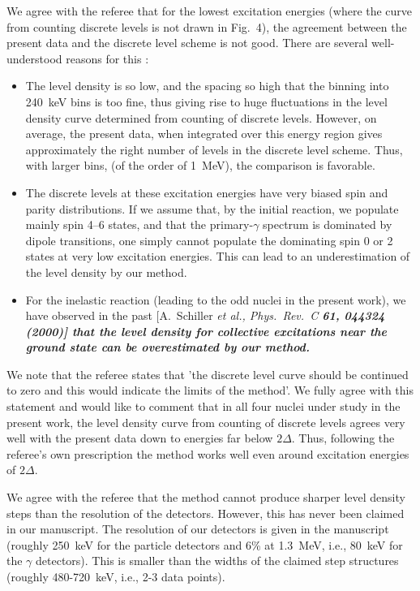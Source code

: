 \documentclass{article}
\begin{document}
We agree with the referee that for the lowest excitation energies (where the 
curve from counting discrete levels is not drawn in Fig.\ 4), the agreement 
between the present data and the discrete level scheme is not good. There are
several well-understood reasons for this :
\begin{itemize}
\item The level density is so low, and the spacing so high that the binning 
into 240~keV bins is too fine, thus giving rise to huge fluctuations in the 
level density curve determined from counting of discrete levels. However, on 
average, the present data, when integrated over this energy region gives 
approximately the right number of levels in the discrete level scheme. Thus, 
with larger bins, (of the order of 1~MeV), the comparison is favorable.
\item The discrete levels at these excitation energies have very biased spin 
and parity distributions. If we assume that, by the initial reaction, we 
populate mainly spin 4--6 states, and that the primary-$\gamma$ spectrum is 
dominated by dipole transitions, one simply cannot populate the dominating spin
0 or 2 states at very low excitation energies. This can lead to an 
underestimation of the level density by our method.
\item For the inelastic reaction (leading to the odd nuclei in the present 
work), we have observed in the past [A.~Schiller \sl et al.\rm, Phys.\ Rev.\ C
\bf 61\rm, 044324 (2000)] that the level density for collective excitations 
near the ground state can be overestimated by our method.
\end{itemize}
We note that the referee states that 'the discrete level curve should be 
continued to zero and this would indicate the limits of the method'. We fully 
agree with this statement and would like to comment that in all four nuclei 
under study in the present work, the level density curve from counting of 
discrete levels agrees very well with the present data down to energies far 
below $2\Delta$. Thus, following the referee's own prescription the method 
works well even around excitation energies of $2\Delta$.

We agree with the referee that the method cannot produce sharper level density
steps than the resolution of the detectors. However, this has never been 
claimed in our manuscript. The resolution of our detectors is given in the 
manuscript (roughly 250~keV for the particle detectors and 6\% at 1.3~MeV, 
i.e., 80~keV for the $\gamma$ detectors). This is smaller than the widths of 
the claimed step structures (roughly 480-720~keV, i.e., 2-3 data points).
\end{document}
